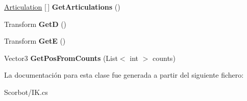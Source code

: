 \begin{DoxyCompactItemize}
\item 
\mbox{\label{class_i_k_ae8f0fe38cdc7d2280fc4c9343176810a}} 
\mbox{\hyperlink{class_articulation}{Articulation}} \mbox{[}$\,$\mbox{]} {\bfseries Get\+Articulations} ()
\item 
\mbox{\label{class_i_k_aa7d322903f3e24412e87ec8b8f9281a0}} 
Transform {\bfseries GetD} ()
\item 
\mbox{\label{class_i_k_a706f81d48d5c7d00791a78b8d09e923e}} 
Transform {\bfseries GetE} ()
\item 
\mbox{\label{class_i_k_a265ad7e93d155fb6183a60baa8d97b4d}} 
Vector3 {\bfseries Get\+Pos\+From\+Counts} (List$<$ int $>$ counts)
\end{DoxyCompactItemize}


La documentación para esta clase fue generada a partir del siguiente fichero\+:\begin{DoxyCompactItemize}
\item 
Scorbot/I\+K.\+cs\end{DoxyCompactItemize}
